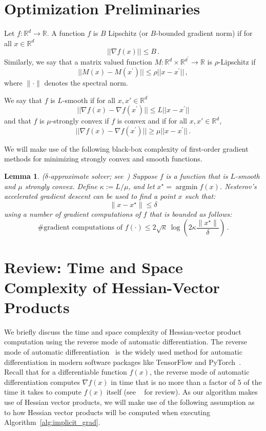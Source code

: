 \documentclass{article} \usepackage[nonatbib, final]{mod_neurips}
\newtheorem{lemma}{Lemma}
\DeclareMathOperator*{\argmin}{\mathrm{argmin}}
\newcommand{\pgrad}{\nabla}
\begin{document}
\section{Optimization Preliminaries}

Let $f:\mathbb{R}^d\rightarrow \mathbb{R}$.
A function $f$ is $B$ Lipschitz (or $B$-bounded gradient norm) if for all $x\in \mathbb{R}^d$
\[
  ||\nabla f(x) || \leq B \, .
\]
Similarly, we say that a matrix valued function $M:\mathbb{R}^d\times \mathbb{R}^{d^\prime}\rightarrow \mathbb{R}$ is $\rho$-Lipschitz if
\[
|| M(x) - M(x^\prime) || \leq \rho ||x - x^\prime|| 
\, ,
\]
where $\|\cdot\|$ denotes the spectral norm.

We say that $f$  is $L$-smooth if for all $x,x'\in \mathbb{R}^d$
\[
  || \nabla f(x) - \nabla f(x^\prime) || \leq L ||x - x^\prime|| 
\]
and that $f$ is $\mu$-strongly convex if $f$ is convex and if for all $x,x'\in \mathbb{R}^d$,
\[
|| \nabla f(x) - \nabla f(x^\prime) || \geq \mu ||x - x^\prime|| 
\, .
\]

We will make use of the following black-box complexity of first-order gradient
methods for minimizing strongly convex and smooth
functions. 

\begin{lemma}\label{lemma:opt}
  ($\delta$-approximate solver; see~\cite{bubeck_book}) Suppose $f$ is
  a function that is $L$-smooth and $\mu$ strongly convex. Define
  $\kappa:=L/\mu$, and let $x^\star = \argmin f(x)$.  Nesterov's
  accelerated gradient descent can be used to find a point $x$ such
  that:
\[
\|x -x^\star\| \leq \delta
\]
using a number of gradient computations of $f$ that is bounded as follows:
\[
\textrm{\# gradient computations of } f(\cdot) \leq 2\sqrt{\kappa}
\,  \log\left( 2\kappa \frac{ \|x^\star\| }{\delta}\right) \, .
\]
\end{lemma}



\section{Review: Time and Space Complexity of Hessian-Vector Products}
\label{sec:hvp}
We briefly discuss the time and space complexity of Hessian-vector
product computation using the reverse mode of automatic
differentiation. The reverse mode of automatic
differentiation~\citep{Baur1983TCo,Griewank:2008:EDP:1455489} is the
widely used method for automatic differentiation in modern software
packages like TensorFlow and
PyTorch~\citep{Baydin2015AutomaticDI}.
Recall that for a differentiable function $f(x)$, the reverse mode
of automatic differentiation computes $\pgrad f(x)$ in
time that is no more than a factor of $5$ of the time it takes to compute $f(x)$
itself (see ~\citep{Griewank:2008:EDP:1455489} for review).
As our algorithm makes use of Hessian vector products, we will make use of the
following assumption as to how Hessian vector products will be
computed when executing Algorithm~\ref{alg:implicit_grad}. 
\end{document}
